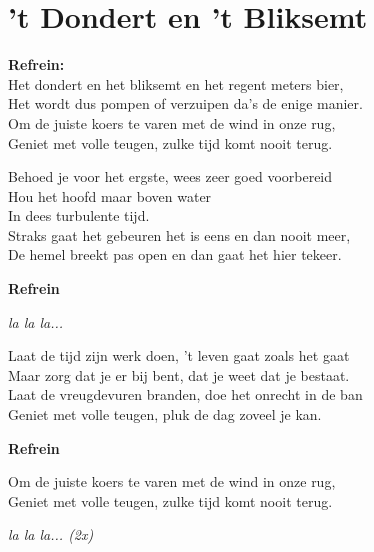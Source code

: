 \section{'t Dondert en 't Bliksemt}

\textbf{Refrein:}\\
Het dondert en het bliksemt en het regent meters bier,\\
Het wordt dus pompen of verzuipen da's de enige manier.\\
Om de juiste koers te varen met de wind in onze rug,\\
Geniet met volle teugen, zulke tijd komt nooit terug.

Behoed je voor het ergste, wees zeer goed voorbereid\\
Hou het hoofd maar boven water\\
In dees turbulente tijd.\\
Straks gaat het gebeuren het is eens en dan nooit meer,\\
De hemel breekt pas open en dan gaat het hier tekeer.

\textbf{Refrein}

\textit{la la la...}

Laat de tijd zijn werk doen, 't leven gaat zoals het gaat\\
Maar zorg dat je er bij bent, dat je weet dat je bestaat.\\
Laat de vreugdevuren branden, doe het onrecht in de ban\\
Geniet met volle teugen, pluk de dag zoveel je kan.

\textbf{Refrein}

Om de juiste koers te varen met de wind in onze rug,\\
Geniet met volle teugen, zulke tijd komt nooit terug.

\textit{la la la... (2x)}
